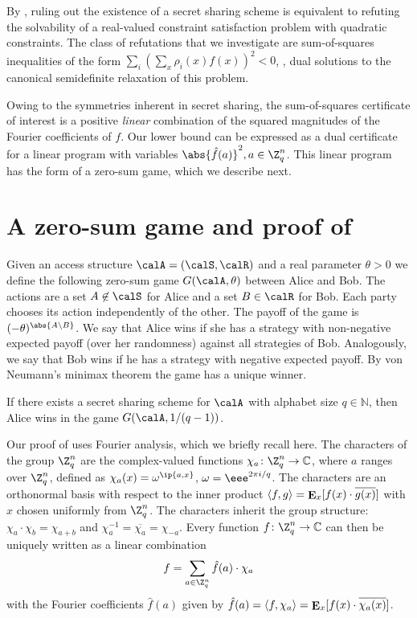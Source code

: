 \documentclass{toc}
\DeclareMathOperator\E{\mathop{\bf E}}
\begin{document}
By , ruling out the existence of a secret sharing scheme is equivalent to refuting the solvability of a real-valued constraint satisfaction problem with quadratic constraints.  
The class of refutations that we investigate are sum-of-squares inequalities of the form $\sum_i (\sum_x \rho_i(x) f(x))^2 < 0$, \ie, 
dual solutions to the canonical semidefinite relaxation of this problem.

Owing to the symmetries inherent in secret sharing, the sum-of-squares certificate of interest is a positive \emph{linear} combination of the squared magnitudes of the Fourier coefficients of $f$.  Our lower bound can be expressed as a dual certificate for a linear program with variables $\abs{\hat{f}(a)}^2, a \in \Z_q^n$.  This linear program has the form of a zero-sum game, which we describe next.


\section{A zero-sum game and proof of }
\label{sec:game}

Given an access structure $\calA = (\calS, \calR)$ and a real parameter
$\theta > 0$ we define the following zero-sum game $G(\calA, \theta)$ between
Alice and Bob. The actions are a set $A \not\in \calS$ for Alice and a set
$B\in \calR$ for Bob.  
Each party chooses its action independently of the other.
The payoff of the game is $(-\theta)^{\abs{A \setminus B}}$.  We say that
Alice wins if she has a strategy with non-negative expected payoff (over her randomness) against all strategies of Bob. Analogously, we say that
Bob wins if he has a strategy with negative expected payoff.  By von Neumann's
minimax theorem the game has a unique winner. 

\begin{lemma}
	\label{lemma:main}
	If there exists a secret sharing scheme for $\calA$ with alphabet size
	$q\in\mathbb{N}$, then Alice wins in the game $G(\calA, 1/(q-1))$.
\end{lemma}

Our proof of  uses Fourier analysis, which we briefly
recall here. The characters of the group $\Z_q^n$ are the complex-valued
functions $\chi_a\colon \Z_q^n \to\mathbb{C}$, where $a$ ranges over $\Z_q^n$,
defined as $\chi_a(x) = \omega^{\ip{a, x}}$, $\omega = \eee^{2\pi i/q}$.  
The
characters are an orthonormal basis with respect to the inner product $\langle
f, g \rangle = \E_{x}[f(x) \cdot \overline{g(x)}]$ with $x$
chosen uniformly from $\Z_q^n$.  The characters inherit the group structure: $\chi_a \cdot \chi_b = \chi_{a+b}$ and $\chi_a^{-1} = \overline{\chi_a} = \chi_{-a}$. Every function $f\colon \Z_q^n \to \mathbb{C}$
can then be uniquely written as a linear combination
\[
  f = \sum_{a \in \Z_q^n}
  \hat{f}(a) \cdot \chi_a
\]
with the Fourier coefficients $\hat{f}(a)$ given by
$\hat{f}(a) = \langle f,\chi_a \rangle = \E_{x}[f(x)\cdot
\overline{\chi_a(x)}]$.
\end{document}
